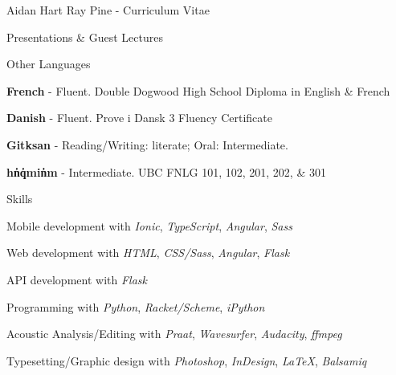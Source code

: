 \documentclass[12pt]{letter}
\begin{document}
\begin{cv}{ Aidan Hart Ray Pine  \space - \space   Curriculum Vitae}
\begin{cvlist}{Presentations \& Guest Lectures}
        \end{cvlist}
        \begin{cvlist}{Other Languages}
                            \item \textbf{French} - Fluent. Double Dogwood High School Diploma in English \& French
                            \item \textbf{Danish} - Fluent. Prove i Dansk 3 Fluency Certificate
                            \item \textbf{Gitksan} - Reading/Writing: literate; Oral: Intermediate. 
                            \item \textbf{h{\textschwa}n̓q̓{\textschwa}min̓{\textschwa}m} - Intermediate. UBC FNLG 101, 102, 201, 202, \& 301
                    \end{cvlist}
        
         \begin{cvlist}{Skills}
                        \item Mobile development with  \textit{Ionic},  \textit{TypeScript},  \textit{Angular},  \textit{Sass}                         \item Web development with  \textit{HTML},  \textit{CSS/Sass},  \textit{Angular},  \textit{Flask}                         \item API development with  \textit{Flask}                         \item Programming with  \textit{Python},  \textit{Racket/Scheme},  \textit{iPython}                         \item Acoustic Analysis/Editing with  \textit{Praat},  \textit{Wavesurfer},  \textit{Audacity},  \textit{ffmpeg}                         \item Typesetting/Graphic design with  \textit{Photoshop},  \textit{InDesign},  \textit{\LaTeX},  \textit{Balsamiq}                      \end{cvlist}


\end{cv}
\end{document}
